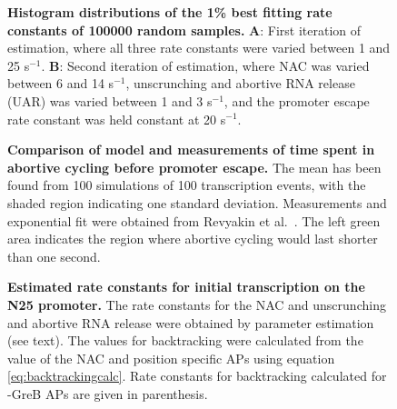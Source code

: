 \begin{figure}[h]
  \caption{ {\bf Histogram distributions of the 1\% best fitting rate
    constants of 100000 random samples.} \textbf{A}: First iteration of
    estimation, where all three rate constants were varied between 1 and 25
    s$^{-1}$. \textbf{B}: Second iteration of estimation, where NAC was varied
    between 6 and 14 s$^{-1}$, unscrunching and abortive RNA release (UAR)
    was varied between 1 and 3 s$^{-1}$, and the promoter escape rate constant was
    held constant at 20 s$^{-1}$.}
    \label{fig:parameter_estimation_proper}
\end{figure}

\begin{figure}[h]
  \caption{{\bf Comparison of model and measurements of time spent in abortive
        cycling before promoter escape.} The mean has been found from 100
        simulations of 100 transcription events, with the shaded region
        indicating one standard deviation. Measurements and exponential fit
        were obtained from Revyakin et al.\ \cite{revyakin_abortive_2006}. The
        left green area indicates the region where abortive cycling would last
        shorter than one second.}
\label{fig:revyakin_fit}
\end{figure}

\begin{figure}[h]
    \caption{ {\bf Estimated rate constants for initial transcription on the N25
      promoter.} The rate constants for the NAC and unscrunching and abortive
      RNA release were obtained by parameter estimation (see text). The values
      for backtracking were calculated from the value of the NAC and position
      specific APs using equation \eqref{eq:backtrackingcalc}. Rate constants
      for backtracking calculated for -GreB APs are given in parenthesis.}
    \label{fig:estimated_parameters}
\end{figure}


